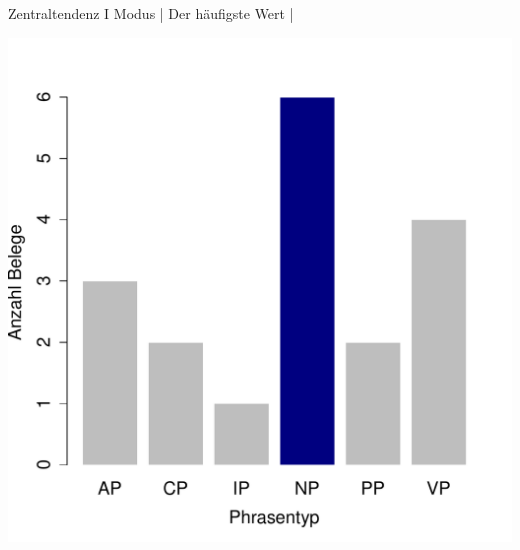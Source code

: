 \begin{frame}
  {Zentraltendenz I}
  \alert{Modus} | Der \alert{häufigste Wert} | \\
  \Zeile
  \begin{center}
    \includegraphics[height=0.6\textheight]{RVorlesung/mode}
  \end{center}
\end{frame}


